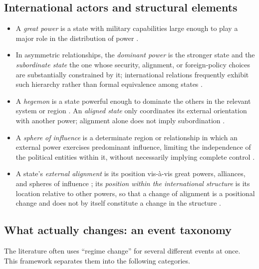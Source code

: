 \documentclass[11pt]{article}
\begin{document}
\subsection{International actors and structural elements}

\begin{itemize}
	\item A \emph{great power} is a state with military capabilities large enough to play a major role in the distribution of power \parencite{mearsheimer_2001}.
	\item In asymmetric relationships, the \emph{dominant power} is the stronger state and the \emph{subordinate state} the one whose security, alignment, or foreign-policy choices are substantially constrained by it; international relations frequently exhibit such hierarchy rather than formal equivalence among states \parencite{lake_2009}. 
	\item A \emph{hegemon} is a state powerful enough to dominate the others in the relevant system or region \parencite{mearsheimer_2001}. An \emph{aligned state} only coordinates its external orientation with another power; alignment alone does not imply subordination \parencite{walt_1987}.
	\item A \emph{sphere of influence} is a determinate region or relationship in which an external power exercises predominant influence, limiting the independence of the political entities within it, without necessarily implying complete control \parencite{keal_1983,hast_2014}.
	\item A state's \emph{external alignment} is its position vis-\`a-vis great powers, alliances, and spheres of influence \parencite{walt_1987}; its \emph{position within the international structure} is its location relative to other powers, so that a change of alignment is a positional change and does not by itself constitute a change in the structure \parencite{waltz_1979}.
\end{itemize}



\subsection{What actually changes: an event taxonomy}

The literature often uses ``regime change'' for several different events at once. This framework separates them into the following categories.
\end{document}
